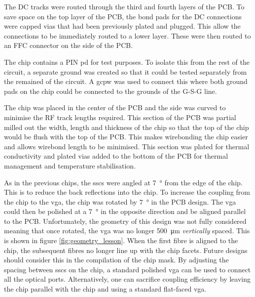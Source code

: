 The DC tracks were routed through the third and fourth layers of the PCB. To save space on the top layer of the PCB, the bond pads for the DC connections were capped vias that had been previously plated and plugged. This allow the connections to be immediately routed to a lower layer. These were then routed to an FFC connector on the side of the PCB.

The chip contains a PIN \ac{pd} for test purposes. To isolate this from the rest of the circuit, a separate ground was created so that it could be tested separately from the remained of the circuit. A \ac{gcpw} was used to connect this where both ground pads on the chip could be connected to the grounds of the G-S-G line.


The chip was placed in the center of the PCB and the side was curved to minimise the RF track lengths required. This section of the PCB was partial milled out the width, length and thickness of the chip so that the top of the chip would be flush with the top of the PCB. This makes wirebonding the chip easier and allows wirebond length to be minimised. This section was plated for thermal conductivity and plated vias added to the bottom of the PCB for thermal management and temperature stabilisation. 

As in the previous chips, the \acp{ssc} were angled at \SI{7}{\degree} from the edge of the chip. This is to reduce the back reflections into the chip. To increase the coupling from the chip to the \ac{vga}, the chip was rotated by \SI{7}{\degree} in the PCB design. The \ac{vga} could then be polished at a \SI{7}{\degree} in the opposite direction and be aligned parallel to the PCB. Unfortunately, the geometry of this design was not fully considered meaning that once rotated, the \ac{vga} was no longer \SI{500}{\um} \textit{vertically} spaced. This is shown in figure \ref{fig:geometry_lesson}. When the first fibre is aligned to the chip, the subsequent fibres no longer line up with the chip facets. Future designs should consider this in the compilation of the chip mask. By adjusting the spacing between \acp{ssc} on the chip, a standard polished \ac{vga} can be used to connect all the optical ports. Alternatively, one can sacrifice coupling efficiency by leaving the chip parallel with the chip and using a standard flat-faced \ac{vga}.

